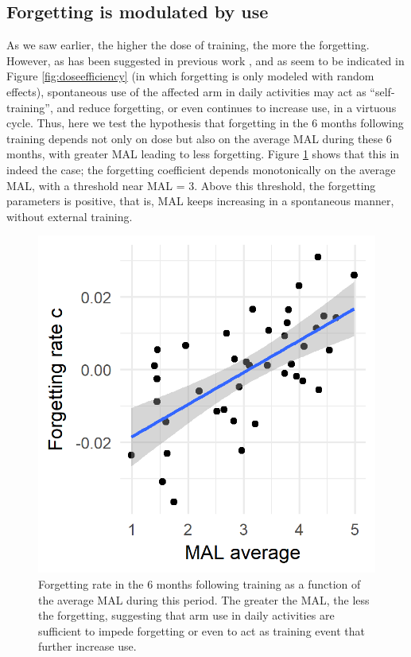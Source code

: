 \subsection{Forgetting is modulated by use}
As we saw earlier, the higher the dose of training, the more the forgetting. 
However, as has been suggested in previous work \cite{Schweighofer2009}, and as seem to be indicated in Figure \ref{fig:doseefficiency} (in which forgetting is only modeled with random effects), spontaneous use of the affected arm in daily activities may act as “self-training”, and reduce forgetting, or even continues to increase use, in a virtuous cycle. 
Thus, here we test the hypothesis that forgetting in the 6 months following training depends not only on dose but also on the average MAL during these 6 months, with greater MAL leading to less forgetting. 
Figure \ref{fig:forgettingthreshold} shows that this in indeed the case; the forgetting coefficient depends monotonically on the average MAL, with a threshold near MAL = 3. 
Above this threshold, the forgetting parameters is positive, that is, MAL keeps increasing in a spontaneous manner, without external training.

\begin{figure}
	\centering
	\includegraphics[width=0.7\linewidth]{figures/Forgetting_threshold}
	\caption[Forgetting rate in the 6 months following training as a function of the average MAL during this period.]{Forgetting rate in the 6 months following training as a function of the average MAL during this period. The greater the MAL, the less the forgetting, suggesting that arm use in daily activities are sufficient to impede forgetting or even to act as training event that further increase use.}
	\label{fig:forgettingthreshold}
\end{figure}

